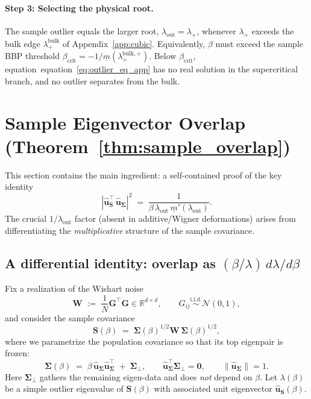 \documentclass{article}
\def\eqref#1{equation~\ref{#1}}
\def\vzero{{\bm{0}}}
\def\vu{{\bm{u}}}
\def\mG{{\bm{G}}}
\def\mS{{\bm{S}}}
\def\mW{{\bm{W}}}
\def\mSigma{{\bm{\Sigma}}}
\def\gN{{\mathcal{N}}}
\def\sR{{\mathbb{R}}}
\begin{document}
\paragraph{Step 3: Selecting the physical root.}
The sample outlier equals the larger root, $\lambda_\mathrm{out}=\lambda_+$, whenever $\lambda_+$ exceeds the bulk edge $\lambda_+^{\mathrm{bulk}}$ of Appendix~\ref{app:cubic}. Equivalently, $\beta$ must exceed the sample BBP threshold $\beta_\mathrm{crit} = -1/\underline{m}(\lambda_+^{\mathrm{bulk},+})$. Below $\beta_\mathrm{crit}$, equation~\eqref{eq:outlier_eq_app} has no real solution in the supercritical branch, and no outlier separates from the bulk.


\section{Sample Eigenvector Overlap (Theorem~\ref{thm:sample_overlap})}\label{app:sample_overlap}

This section contains the main ingredient: a self-contained proof of the key identity
\begin{equation}\label{eq:overlap_sample_goal}
    |\hat\vu_\mS^\top\,\hat\vu_\mSigma|^2 \;=\; \frac{1}{\beta\,\lambda_\mathrm{out}\,\underline{m}'(\lambda_\mathrm{out})}.
\end{equation}
The crucial $1/\lambda_\mathrm{out}$ factor (absent in additive/Wigner deformations) arises from differentiating the \emph{multiplicative} structure of the sample covariance.

\subsection{A differential identity: overlap as \texorpdfstring{$(\beta/\lambda)\,d\lambda/d\beta$}{(beta/lambda) dlambda/dbeta}}

Fix a realization of the Wishart noise
\[
    \mW \;:=\; \frac{1}{N}\mG^\top\mG \in \sR^{d\times d},
    \qquad G_{ij}\stackrel{\mathrm{i.i.d.}}{\sim}\gN(0,1),
\]
and consider the sample covariance
\[
    \mS(\beta) \;=\; \mSigma(\beta)^{1/2}\mW\,\mSigma(\beta)^{1/2},
\]
where we parametrize the population covariance so that its top eigenpair is frozen:
\begin{equation}\label{eq:Sigma_beta_decomp}
    \mSigma(\beta) \;=\; \beta\,\hat\vu_\mSigma\hat\vu_\mSigma^\top \;+\; \mSigma_\perp,
    \qquad \hat\vu_\mSigma^\top\mSigma_\perp=\vzero, \qquad \|\hat\vu_\mSigma\|=1.
\end{equation}
Here $\mSigma_\perp$ gathers the remaining eigen-data and does \emph{not} depend on $\beta$. Let $\lambda(\beta)$ be a simple outlier eigenvalue of $\mS(\beta)$ with associated unit eigenvector $\hat\vu_\mS(\beta)$.
\end{document}
